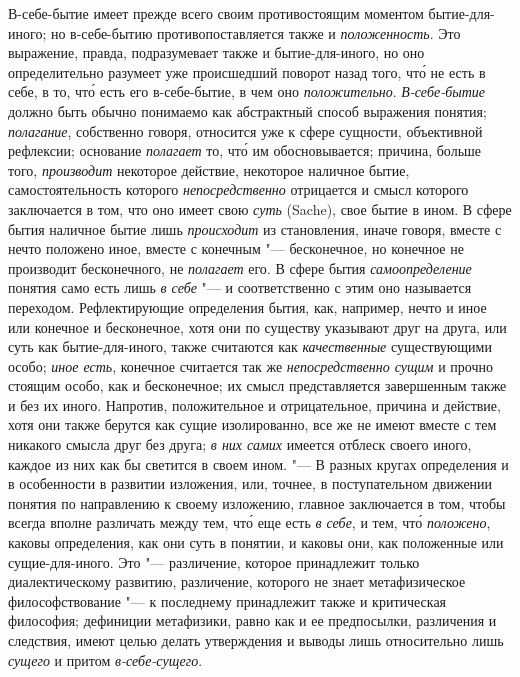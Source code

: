 В-себе-бытие имеет прежде всего своим противостоящим моментом
бытие-для-иного; но в-себе-бытию противопоставляется также и
{\em положенность}. Это выражение, правда,
подразумевает также и бытие-для-иного, но оно определительно разумеет уже
происшедший поворот назад того, чт\'{о} не есть в себе, в то, чт\'{о} есть его
в-себе-бытие, в чем оно {\em положительно}.
{\em В-себе-бытие} должно быть обычно понимаемо как
абстрактный способ выражения понятия; {\em полагание},
собственно говоря, относится уже к сфере сущности, объективной рефлексии;
основание {\em полагает} то, чт\'{о} им обосновывается;
причина, больше того, {\em производит} некоторое
действие, некоторое наличное бытие, самостоятельность которого
{\em непосредственно} отрицается и смысл которого
заключается в том, что оно имеет свою {\em суть}
(Sache), свое бытие в ином. В сфере бытия наличное бытие лишь
{\em происходит} из становления, иначе говоря, вместе с нечто
положено иное, вместе с конечным "--- бесконечное, но конечное не
производит бесконечного, не {\em полагает} его. В сфере
бытия {\em самоопределение} понятия само есть лишь
{\em в себе} "--- и соответственно с этим оно называется
переходом. Рефлектирующие определения бытия, как, например, нечто и иное
или конечное и бесконечное, хотя они по существу указывают друг на друга,
или суть как бытие-для-иного, также считаются как
{\em качественные} существующими особо;
{\em иное есть}, конечное считается так же
{\em непосредственно сущим} и прочно стоящим особо, как
и бесконечное; их смысл представляется завершенным также и без их иного.
Напротив, положительное и отрицательное, причина и действие, хотя они также
берутся как сущие изолированно, все же не имеют вместе с тем никакого
смысла друг без друга; {\em в них самих} имеется
отблеск своего иного, каждое из них как бы светится в своем ином. "--- В
разных кругах определения и в особенности в развитии
изложения, или, точнее, в поступательном движении понятия по направлению к
своему изложению, главное заключается в том, чтобы всегда вполне различать
между тем, чт\'{о} еще есть {\em в себе}, и тем, чт\'{о}
{\em положено}, каковы определения, как они суть в
понятии, и каковы они, как положенные или сущие-для-иного. Это
"--- различение, которое принадлежит только диалектическому развитию,
различение, которого не знает метафизическое философствование "--- к
последнему принадлежит также и критическая философия; дефиниции метафизики,
равно как и ее предпосылки, различения и следствия, имеют целью делать
утверждения и выводы лишь относительно лишь {\em сущего} и
притом {\em в-себе-сущего}.

